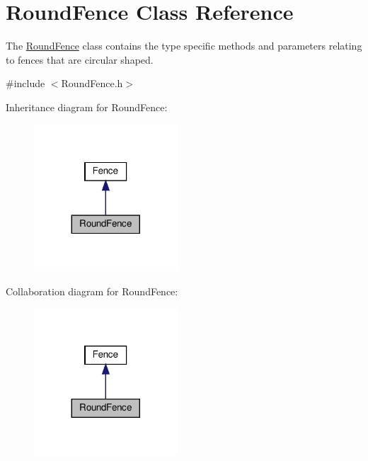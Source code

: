 \hypertarget{class_round_fence}{}\section{Round\+Fence Class Reference}
\label{class_round_fence}


The \hyperlink{class_round_fence}{Round\+Fence} class contains the type specific methods and parameters relating to fences that are circular shaped.  




{\ttfamily \#include $<$Round\+Fence.\+h$>$}



Inheritance diagram for Round\+Fence\+:
\nopagebreak
\begin{figure}[H]
\begin{center}
\leavevmode
\includegraphics[width=152pt]{db/df0/class_round_fence__inherit__graph}
\end{center}
\end{figure}


Collaboration diagram for Round\+Fence\+:
\nopagebreak
\begin{figure}[H]
\begin{center}
\leavevmode
\includegraphics[width=152pt]{dc/dc1/class_round_fence__coll__graph}
\end{center}
\end{figure}
